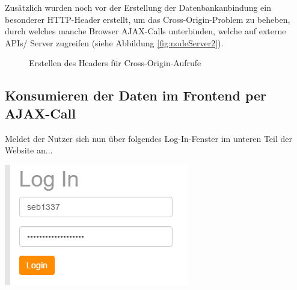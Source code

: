 Zusätzlich wurden noch vor der Erstellung der Datenbankanbindung ein besonderer HTTP-Header erstellt, um das Cross-Origin-Problem zu beheben, durch welches manche Browser AJAX-Calls unterbinden, welche auf externe APIs/ Server zugreifen (siehe Abbildung \vref{fig:nodeServer2}).

\begin{figure}[!h]
	\caption{Erstellen des Headers für Cross-Origin-Aufrufe}
	\label{fig:nodeServer2}
\end{figure}

\subsection{Konsumieren der Daten im Frontend per AJAX-Call}
\label{Konsumieren der Daten im Frontend per AJAX-Call}

Meldet der Nutzer sich nun über folgendes Log-In-Fenster im unteren Teil der Website an...

\includegraphics[scale=0.5]{img/logIn.png}

